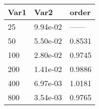 \begin{tabular}{lll}
Var1 & Var2 & order \\ 
\hline 
25 & 9.94e-02 & ------ \\ 
50 & 5.50e-02 & 0.8531 \\ 
100 & 2.80e-02 & 0.9745 \\ 
200 & 1.41e-02 & 0.9886 \\ 
400 & 6.97e-03 & 1.0181 \\ 
800 & 3.54e-03 & 0.9765 \\ 
\hline 
\end{tabular}